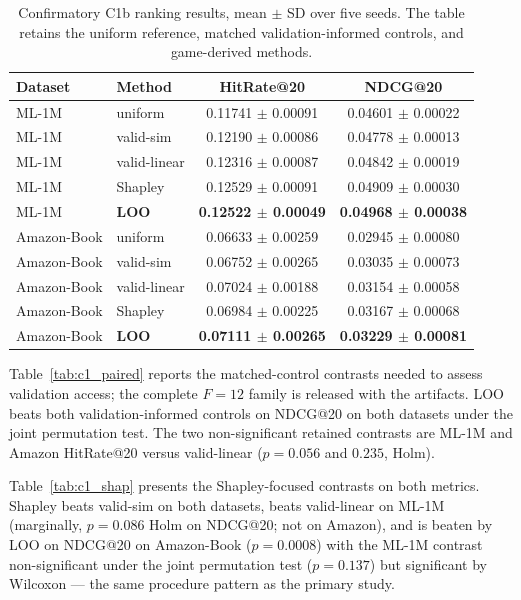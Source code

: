 \documentclass[pdflatex,sn-mathphys-num]{sn-jnl}
\begin{document}
\begin{table}[t]
\caption{Confirmatory C1b ranking results, mean $\pm$ SD over five seeds. The table retains the uniform reference, matched validation-informed controls, and game-derived methods.}\label{tab:c1_main}
\centering
\small
\begin{tabular}{llcc}
\toprule
Dataset & Method & HitRate@20 & NDCG@20 \\
\midrule
ML-1M & uniform & 0.11741 $\pm$ 0.00091 & 0.04601 $\pm$ 0.00022 \\
ML-1M & valid-sim & 0.12190 $\pm$ 0.00086 & 0.04778 $\pm$ 0.00013 \\
ML-1M & valid-linear & 0.12316 $\pm$ 0.00087 & 0.04842 $\pm$ 0.00019 \\
ML-1M & Shapley & 0.12529 $\pm$ 0.00091 & 0.04909 $\pm$ 0.00030 \\
ML-1M & \textbf{LOO} & \textbf{0.12522 $\pm$ 0.00049} & \textbf{0.04968 $\pm$ 0.00038} \\
Amazon-Book & uniform & 0.06633 $\pm$ 0.00259 & 0.02945 $\pm$ 0.00080 \\
Amazon-Book & valid-sim & 0.06752 $\pm$ 0.00265 & 0.03035 $\pm$ 0.00073 \\
Amazon-Book & valid-linear & 0.07024 $\pm$ 0.00188 & 0.03154 $\pm$ 0.00058 \\
Amazon-Book & Shapley & 0.06984 $\pm$ 0.00225 & 0.03167 $\pm$ 0.00068 \\
Amazon-Book & \textbf{LOO} & \textbf{0.07111 $\pm$ 0.00265} & \textbf{0.03229 $\pm$ 0.00081} \\
\bottomrule
\end{tabular}
\end{table}

Table~\ref{tab:c1_paired} reports the matched-control contrasts needed to assess validation access; the complete $F=12$ family is released with the artifacts. LOO beats both validation-informed controls on NDCG@20 on both datasets under the joint permutation test. The two non-significant retained contrasts are ML-1M and Amazon HitRate@20 versus valid-linear ($p=0.056$ and $0.235$, Holm).

Table~\ref{tab:c1_shap} presents the Shapley-focused contrasts on both metrics. Shapley beats valid-sim on both datasets, beats valid-linear on ML-1M (marginally, $p=0.086$ Holm on NDCG@20; not on Amazon), and is beaten by LOO on NDCG@20 on Amazon-Book ($p=0.0008$) with the ML-1M contrast non-significant under the joint permutation test ($p=0.137$) but significant by Wilcoxon --- the same procedure pattern as the primary study.
\end{document}
